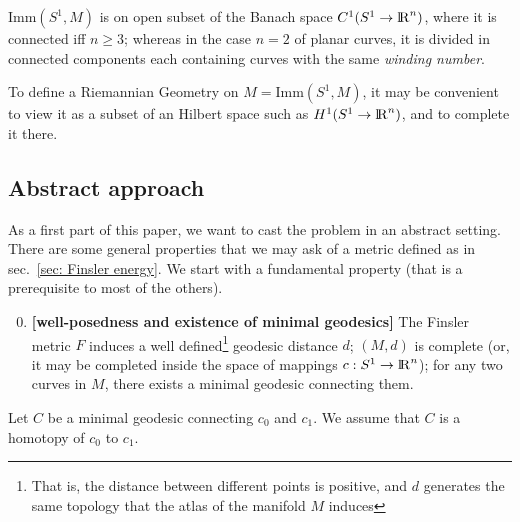 \documentclass[twoside,a4paper,english]{article}
\begin{document}
\begin{Remark}[extending $M$]
  $\mbox{Imm}(S^1,M)$ is on open subset of the Banach space
  $C^1(S^1\to{\protect\mathrm{l\hskip-0.15em R}}^n)$, where it is connected iff $n\ge 3$; whereas
  in the case $n=2$ of planar curves, it is divided in connected
  components each containing curves with the same 
  \emph{winding number}. 

  
  To define a Riemannian Geometry on $M=\mbox{Imm}(S^1,M)$,
  it may be convenient to view it as a subset of an Hilbert
  space such as $H^1(S^1\to{\protect\mathrm{l\hskip-0.15em R}}^n)$, and to complete it there.
\end{Remark}


\subsection{Abstract approach}
\label{sec: gen pro}

As a first part of this paper, we want to cast the problem
in an abstract setting.
There are some general properties that we may ask of a metric
defined as in sec.~\ref{sec: Finsler energy}.
We start with a fundamental property (that is a prerequisite
to most of the others).

\begin{enumerate}
\setcounter{enumi}{-1}
\item{\bf[well-posedness and existence of minimal geodesics]} The
  Finsler metric $F$ induces a well defined\footnote{That is, 
    the distance between different points is positive, and
    $d$ generates the same topology that the atlas of the manifold $M$ induces}
  geodesic distance $d$;
  $(M,d)$ is complete (or, it may be completed inside the space of
  mappings $c:S^1\to{\protect\mathrm{l\hskip-0.15em R}}^n$); 
  for any two curves in $M$, there exists a minimal
  geodesic connecting them.
\end{enumerate}

Let $C$ be a minimal geodesic connecting $c_0$ and $c_1$.
We assume that $C$ is a homotopy of $c_0$ to $c_1$.
\end{document}
